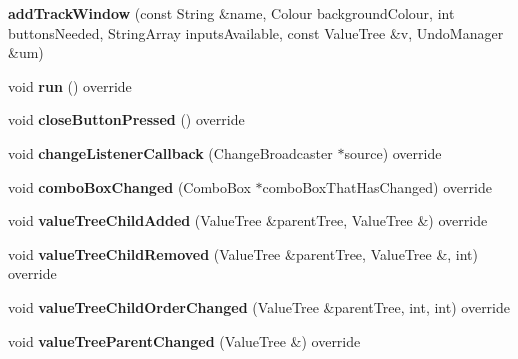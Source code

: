 \begin{DoxyCompactItemize}
\item 
\mbox{\label{classadd_track_window_a2c9ef68eae086ee90cbcf57760f766c1}} 
{\bfseries add\+Track\+Window} (const String \&name, Colour background\+Colour, int buttons\+Needed, String\+Array inputs\+Available, const Value\+Tree \&v, Undo\+Manager \&um)
\item 
\mbox{\label{classadd_track_window_a8cf2dce50a86159ccebbfdbe612fd577}} 
void {\bfseries run} () override
\item 
\mbox{\label{classadd_track_window_a13f5282d0d8a2baaeed3bf1820d57599}} 
void {\bfseries close\+Button\+Pressed} () override
\item 
\mbox{\label{classadd_track_window_a1a952e89fa498991a20a7ded79b03805}} 
void {\bfseries change\+Listener\+Callback} (Change\+Broadcaster $\ast$source) override
\item 
\mbox{\label{classadd_track_window_aba316be940be484109229c0453176612}} 
void {\bfseries combo\+Box\+Changed} (Combo\+Box $\ast$combo\+Box\+That\+Has\+Changed) override
\item 
\mbox{\label{classadd_track_window_a8a6b233a77a8019d119c8f9284ba083c}} 
void {\bfseries value\+Tree\+Child\+Added} (Value\+Tree \&parent\+Tree, Value\+Tree \&) override
\item 
\mbox{\label{classadd_track_window_a180abe15f0a4dd0f0dbe879c112ad021}} 
void {\bfseries value\+Tree\+Child\+Removed} (Value\+Tree \&parent\+Tree, Value\+Tree \&, int) override
\item 
\mbox{\label{classadd_track_window_abbafdc4b89c88d871549f57b4465e8cb}} 
void {\bfseries value\+Tree\+Child\+Order\+Changed} (Value\+Tree \&parent\+Tree, int, int) override
\item 
\mbox{\label{classadd_track_window_a5980372f21bc4dd007de8905f305eae1}} 
void {\bfseries value\+Tree\+Parent\+Changed} (Value\+Tree \&) override
\item 

\end{DoxyCompactItemize}
